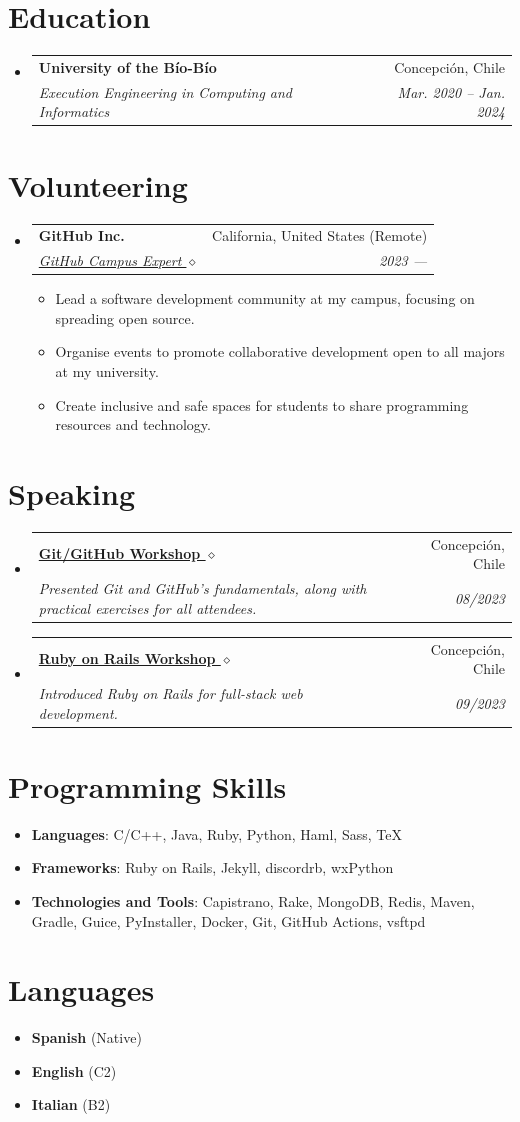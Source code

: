 \documentclass[letterpaper,11pt]{article}
\makeatletter
\newcommand{\resumeSubheading}[4]{
  \vspace{-1pt}\item
    \begin{tabular*}{0.97\textwidth}[t]{l@{\extracolsep{\fill}}r}
      \textbf{#1} & #2 \\
      \textit{\small#3} & \textit{\small #4} \\
    \end{tabular*}\vspace{-5pt}
}
\newcommand{\resumeSubHeadingListStart}{\begin{itemize}[leftmargin=*]}
\newcommand{\resumeSubHeadingListEnd}{\end{itemize}}
\newcommand{\resumeItemListStart}{\begin{itemize}}
\newcommand{\resumeItemListEnd}{\end{itemize}\vspace{-5pt}}
\makeatother
\begin{document}
  \section{Education}
  \resumeSubHeadingListStart
    \resumeSubheading
      {University of the Bío-Bío}{Concepción, Chile}
      {Execution Engineering in Computing and Informatics}{Mar. 2020 -- Jan. 2024}
  \resumeSubHeadingListEnd
  
\section{Volunteering}
  \resumeSubHeadingListStart
    \resumeSubheading
    {GitHub Inc.}{California, United States (Remote)}
    {\href{https://githubcampus.expert/BGMP}{GitHub Campus Expert $\diamond$}}{2023 ---}
    \resumeItemListStart
      \item{Lead a software development community at my campus, focusing on spreading open source.}
      \item{Organise events to promote collaborative development open to all majors at my university.}
      \item{Create inclusive and safe spaces for students to share programming resources and technology.}
    \resumeItemListEnd
    \resumeSubHeadingListEnd
    
\section{Speaking}
  \resumeSubHeadingListStart
    \resumeSubheading
    {\href{https://bgm.dev/about}{Git/GitHub Workshop $\diamond$}}{Concepción, Chile}
    {Presented Git and GitHub’s fundamentals, along with practical exercises for all attendees.}{08/2023}
    \resumeSubheading
    {\href{https://bgm.dev/about}{Ruby on Rails Workshop $\diamond$}}{Concepción, Chile}
    {Introduced Ruby on Rails for full-stack web development.}{09/2023}
  \resumeSubHeadingListEnd

\section{Programming Skills}
  \resumeSubHeadingListStart
    \item{
      \textbf{Languages}{: C/C++, Java, Ruby, Python, Haml, Sass, TeX}
    }
    \item{
      \textbf{Frameworks}{: Ruby on Rails, Jekyll, discordrb, wxPython}
    }
    \item{
      \textbf{Technologies and Tools}{: Capistrano, Rake, MongoDB, Redis, Maven, Gradle, Guice, PyInstaller, Docker, Git, GitHub Actions, vsftpd}
    }
  \resumeSubHeadingListEnd

\section{Languages}
\resumeSubHeadingListStart
\item{
  \textbf{Spanish}{ (Native)}
}
\item{
  \textbf{English}{ (C2)}
}
\item{
  \textbf{Italian}{ (B2)}
}
\resumeSubHeadingListEnd

\end{document}
